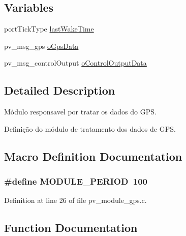 \subsection*{Variables}
\begin{DoxyCompactItemize}
\item 
port\+Tick\+Type \hyperlink{group__app__gps_gaa8db3871cb5f64abbd94ddd5a1db73a6}{last\+Wake\+Time}
\item 
pv\+\_\+msg\+\_\+gps \hyperlink{group__app__gps_ga744821cc9c45de009ae70e6dc8d5e220}{o\+Gps\+Data}
\item 
pv\+\_\+msg\+\_\+control\+Output \hyperlink{group__app__gps_ga0a14ca4568444d2d76c256fa91585cdf}{o\+Control\+Output\+Data}
\end{DoxyCompactItemize}


\subsection{Detailed Description}
Módulo responsavel por tratar os dados do G\+PS. 

Definição do módulo de tratamento dos dados de G\+PS. 

\subsection{Macro Definition Documentation}
\subsubsection[{\texorpdfstring{M\+O\+D\+U\+L\+E\+\_\+\+P\+E\+R\+I\+OD}{MODULE_PERIOD}}]{\setlength{\rightskip}{0pt plus 5cm}\#define M\+O\+D\+U\+L\+E\+\_\+\+P\+E\+R\+I\+OD~100}\hypertarget{group__app__gps_ga0ac6c9f2991b096e49c354e5cce6fae0}{}\label{group__app__gps_ga0ac6c9f2991b096e49c354e5cce6fae0}


Definition at line 26 of file pv\+\_\+module\+\_\+gps.\+c.



\subsection{Function Documentation}
